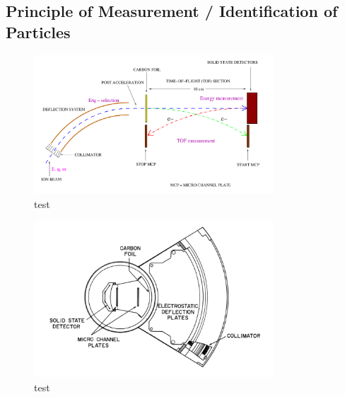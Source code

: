 \subsection{Principle of Measurement / Identification of Particles}
\label{subsec:measurement}
\begin{figure}[h]
	\includegraphics[width=0.8\textwidth]{Figures/Lars_Swics.png}
	\centering
	\caption{test}
	\label{fig:lars_swics}
\end{figure}


\begin{figure}[h]
	\includegraphics[width=0.8\textwidth]{Figures/swics_sensor.pdf}
	\centering
	\caption{test}
	\label{fig:sensor_swics}
\end{figure}
